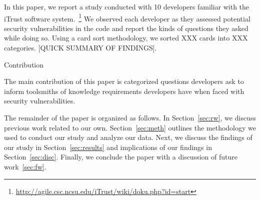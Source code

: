 \documentclass[conference]{IEEEtran}
\begin{document}
In this paper, we report a study conducted with 10 developers familiar with the iTrust software system.~\footnote{\url{http://agile.csc.ncsu.edu/iTrust/wiki/doku.php?id=start}} We observed each developer as they assessed potential security vulnerabilities in the code and report the kinds of questions they asked while doing so. Using a card sort methodology, we sorted XXX cards into XXX categories. [QUICK SUMMARY OF FINDINGS]. 

Contribution

The main contribution of this paper is categorized questions developers ask to inform toolsmiths of knowledge requirements developers have when faced with security vulnerabilities.

The remainder of the paper is organized as follows. In Section~\ref{sec:rw}, we discuss previous work related to our own. Section~\ref{sec:meth} outlines the methodology we used to conduct our study and analyze our data. Next, we discuss the findings of our study in Section~\ref{sec:results} and implications of our findings in Section~\ref{sec:disc}. Finally, we conclude the paper with a discussion of future work~\ref{sec:fw}.



%
%

\end{document}

